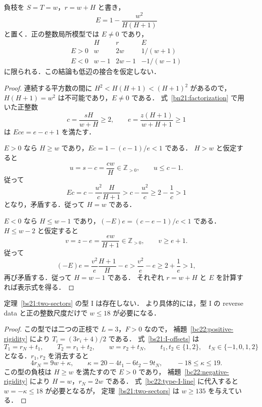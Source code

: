 \begin{lemma}
\label{bc22:negative-rigidity}
負枝を $S=T=w$，$r=w+H$ と書き，
\[
 E=1-\frac{w^2}{H(H+1)}
\]
と置く．正の整数局所模型では $E\ne0$ であり，
\begin{equation}\label{bc22:negative-rigidity-data}
 \begin{array}{c|ccc}
  &H&r&E\\\hline
  E>0&w&2w&1/(w+1)\\
  E<0&w-1&2w-1&-1/(w-1)
 \end{array}
\end{equation}
に限られる．この結論も低辺の接合を仮定しない．
\end{lemma}

\begin{proof}
連続する平方数の間に $H^2<H(H+1)<(H+1)^2$ があるので，
$H(H+1)=w^2$ は不可能であり，$E\ne0$ である．
式~\eqref{bn21:factorization} で用いた正整数
\[
 c=\frac{sH}{w+H}\ge2,\qquad
 e=\frac{z(H+1)}{w+H+1}\ge1
\]
は $Ece=e-c+1$ を満たす．

$E>0$ なら $H\ge w$ であり，$Ec=1-(c-1)/e<1$ である．
$H>w$ と仮定すると
\[
 u=s-c=\frac{cw}{H}\in\mathbb Z_{>0},\qquad u\le c-1.
\]
従って
\[
 Ec=c-\frac{u^2}{c}\frac{H}{H+1}
 >c-\frac{u^2}{c}
 \ge2-\frac1c>1
\]
となり，矛盾する．従って $H=w$ である．

$E<0$ なら $H\le w-1$ であり，$(-E)e=(c-e-1)/c<1$ である．
$H\le w-2$ と仮定すると
\[
 v=z-e=\frac{ew}{H+1}\in\mathbb Z_{>0},\qquad v\ge e+1.
\]
従って
\[
 (-E)e=\frac{v^2}{e}\frac{H+1}{H}-e
 >\frac{v^2}{e}-e
 \ge2+\frac1e>1,
\]
再び矛盾する．従って $H=w-1$ である．
それぞれ $r=w+H$ と $E$ を計算すれば表示式を得る．
\end{proof}

\begin{proposition}[型 I の解析的排除]
\label{bc22:type-I}
定理~\ref{bs21:two-sectors} の型 I は存在しない．
より具体的には，型 I の reverse data と正の整数尺度だけで
$w\le18$ が必要になる．
\end{proposition}

\begin{proof}
この型では二つの正枝で $L=3$，$F>0$ なので，
補題~\ref{bc22:positive-rigidity} により
$T_i=(3r_i+4)/2$ である．
式~\eqref{bs21:I-offsets} は
\[
 T_1=r_N+t_1,\qquad T_2=r_1+t_2,\qquad w=r_2+t_N,
 \qquad t_1,t_2\in\{1,2\},\quad t_N\in\{-1,0,1,2\}
\]
となる．$r_1,r_2$ を消去すると
\begin{equation}\label{bc22:type-I-line}
 4r_N=9w+\kappa,\qquad
 \kappa=20-4t_1-6t_2-9t_N,\qquad -18\le\kappa\le19.
\end{equation}
この型の負枝は $H\ge w$ を満たすので $E>0$ であり，
補題~\ref{bc22:negative-rigidity} により $H=w$，$r_N=2w$ である．
式~\eqref{bc22:type-I-line} に代入すると $w=-\kappa\le18$ が必要となるが，
定理~\ref{bs21:two-sectors} は $w\ge135$ を与えている．
\end{proof}

